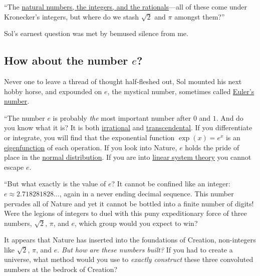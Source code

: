 \documentclass[
  a4paper,
]{article}
\begin{document}
``The
\href{https://swanlotus.netlify.app/blogs/the-two-most-important-numbers-zero-and-one}{natural
numbers, the integers, and the rationals}---all of these come under
Kronecker's integers, but where do we stash \(\sqrt{2}\) and \(\pi\)
amongst them?''

Sol's earnest question was met by bemused silence from me.

\subsection{\texorpdfstring{How about the number
\(e\)?}{How about the number e?}}\label{how-about-the-number-e}

Never one to leave a thread of thought half-fleshed out, Sol mounted his
next hobby horse, and expounded on
\href{https://en.wikipedia.org/wiki/E_(mathematical_constant)}{\(e\)},
the mystical number, sometimes called
\href{https://en.wikipedia.org/wiki/E_(mathematical_constant)}{Euler's
number}.

``The number \(e\) is probably \emph{the} most important number after
\(0\) and \(1\). And do you know what it is? It is both
\href{https://mathworld.wolfram.com/IrrationalNumber.html}{irrational}
and
\href{https://en.wikipedia.org/wiki/Transcendental_number}{transcendental}.
If you differentiate or integrate, you will find that the exponential
function \(\exp(x) = e^x\) is an
\href{https://swanlotus.netlify.app/blogs/eigenvalues-and-eigenvectors-why-are-they-important}{eigenfunction}
of each operation. If you look into Nature, \(e\) holds the pride of
place in the
\href{https://www.khanacademy.org/math/statistics-probability/modeling-distributions-of-data/normal-distributions-library/a/normal-distributions-review}{normal
distribution}. If you are into
\href{https://www.cns.nyu.edu/~david/handouts/linear-systems/linear-systems.html}{linear
system theory} you cannot escape \(e\).

``But what exactly is the value of \(e\)? It cannot be confined like an
integer: \(e \approx 2.718281828\dots\), again in a never ending decimal
sequence. This number pervades all of Nature and yet it cannot be
bottled into a finite number of digits! Were the legions of integers to
duel with this puny expeditionary force of three numbers, \(\sqrt{2}\),
\(\pi\), and \(e\), which group would you expect to win?

It appears that Nature has inserted into the foundations of Creation,
non-integers like \(\sqrt{2}\), \(\pi\), and \(e\). \emph{But how are
these numbers built?} If you had to create a universe, what method would
you use to \emph{exactly construct} these three convoluted numbers at
the bedrock of Creation?
\end{document}
